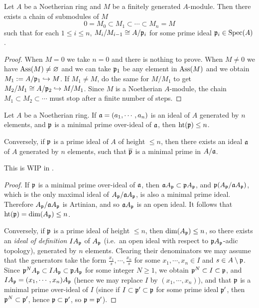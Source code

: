 \begin{prop}
\label{noeth-ring-filtration}
Let $A$ be a Noetherian ring and $M$ be a finitely generated $A$-module.
Then there exists a chain of submodules of $M$
\[0 = M_0 \subset M_1 \subset \cdots \subset M_n = M\]
such that for each $1\leq i\leq n$, $M_i/M_{i-1} \cong A/{\mathfrak{p}}_i$ for some prime ideal ${\mathfrak{p}}_i\in{\mathrm{Spec}}(A)$.
\end{prop}

\begin{proof}
When $M=0$ we take $n=0$ and there is nothing to prove.
When $M\neq 0$ we have $\operatorname{Ass}(M)\neq\varnothing$
and we can take ${\mathfrak{p}}_1$ be any element in $\operatorname{Ass}(M)$
and we obtain $M_1:=A/{\mathfrak{p}}_1\hookrightarrow M$.
If $M_1\neq M$, do the same for $M/M_1$ to get $M_2/M_1\cong A/{\mathfrak{p}}_2\hookrightarrow M/M_1$.
Since $M$ is a Noetherian $A$-module,
the chain $M_1\subset M_2\subset\cdots$ must stop after a finite number of steps.
\end{proof}

\begin{thm}
\label{krull-principal-ideal-thm}
Let $A$ be a Noetherian ring.
If ${\mathfrak{a}}=(a_1,\cdots,a_n)$ is an ideal of $A$ generated by $n$ elements,
and ${\mathfrak{p}}$ is a minimal prime over-ideal of ${\mathfrak{a}}$, then ${\mathrm{ht}}({\mathfrak{p}})\leq n$.

Conversely, if ${\mathfrak{p}}$ is a prime ideal of $A$ of height $\leq n$,
then there exists an ideal ${\mathfrak{a}}$ of $A$ generated by $n$ elements, such that
$\overline{{\mathfrak{p}}}$ is a minimal prime in $A/{\mathfrak{a}}$.
\end{thm}

This is WIP in .

\begin{proof}
If ${\mathfrak{p}}$ is a minimal prime over-ideal of ${\mathfrak{a}}$, then ${\mathfrak{a}} A_{\mathfrak{p}}\subset{\mathfrak{p}} A_{\mathfrak{p}}$,
and ${\mathfrak{p}}(A_{\mathfrak{p}}/{\mathfrak{a}} A_{\mathfrak{p}})$, which is the only maximal ideal of
$A_{\mathfrak{p}}/{\mathfrak{a}} A_{\mathfrak{p}}$, is also a minimal prime ideal.
Therefore $A_{\mathfrak{p}}/{\mathfrak{a}} A_{\mathfrak{p}}$ is Artinian, and so
${\mathfrak{a}} A_{\mathfrak{p}}$ is an open ideal. It follows that ${\mathrm{ht}}({\mathfrak{p}})=\dim(A_{\mathfrak{p}})\leq n$.

Conversely, if ${\mathfrak{p}}$ is a prime ideal of height $\leq n$,
then $\dim(A_{\mathfrak{p}})\leq n$, so there exists an \emph{ideal of definition}
$IA_{\mathfrak{p}}$ of $A_{\mathfrak{p}}$
(i.e.~an open ideal with respect to ${\mathfrak{p}} A_{\mathfrak{p}}$-adic topology),
generated by $n$ elements.
Clearing their denominators we may assume that the generators take the form
$\frac{x_1}s,\cdots,\frac{x_n}s$ for some $x_1,\cdots,x_n\in I$
and $s\in A\setminus{\mathfrak{p}}$.
Since ${\mathfrak{p}}^NA_{\mathfrak{p}}\subset IA_{\mathfrak{p}}\subset{\mathfrak{p}} A_{\mathfrak{p}}$ for some integer $N\geq 1$,
we obtain ${\mathfrak{p}}^N\subset I\subset{\mathfrak{p}}$, and
$IA_{\mathfrak{p}}=(x_1,\cdots,x_n)A_{\mathfrak{p}}$
(hence we may replace $I$ by $(x_1,\cdots,x_n)$), and that ${\mathfrak{p}}$ is a minimal prime over-ideal of $I$
(since if $I\subset{\mathfrak{p}}'\subset{\mathfrak{p}}$ for some prime ideal ${\mathfrak{p}}'$,
then ${\mathfrak{p}}^N\subset{\mathfrak{p}}'$, hence ${\mathfrak{p}}\subset{\mathfrak{p}}'$, so ${\mathfrak{p}}={\mathfrak{p}}'$).
\end{proof}

